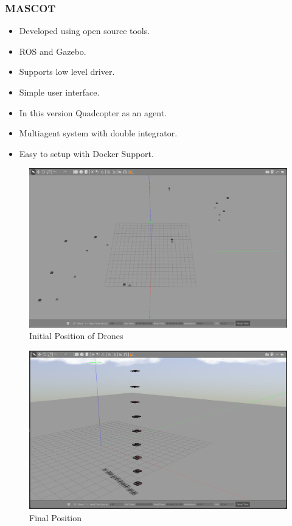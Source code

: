 \documentclass[10pt]{beamer}
\begin{document}
\begin{frame}
	\frametitle{MASCOT}
	\begin{itemize}
		\item Developed using open source tools.
		\item ROS and Gazebo.
		\item Supports low level driver.
		\item Simple user interface.
		\item In this version Quadcopter as an agent.
		\item Multiagent system with double integrator.
		\item Easy to setup with Docker Support.
	\end{itemize}
	\vspace*{0.2 cm}
	\pause
	\begin{minipage}{0.47\textwidth}
		\begin{figure}[h!]
			\centering
			\includegraphics[scale=0.09]{10-drone-position-not-aligned.png}
			\caption{Initial Position of Drones}
			\label{Fig:pos_in}
		\end{figure}
	\end{minipage}
	\begin{minipage}{0.47\textwidth}
		\begin{figure}[h!]
			\centering
			\includegraphics[scale=0.09]{10-drone-position-aligned.png}
			\caption{Final Position}
			\label{Fig:pos_fi}
		\end{figure}
	\end{minipage}

\end{frame}
\end{document}
